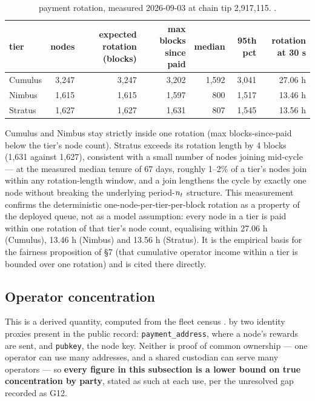 \begin{table}[H]
\centering
\small
\begin{tabular}{lrrrrrr}
\toprule
tier & nodes & expected rotation (blocks) & max blocks since paid & median & 95th pct & rotation at 30 s \\
\midrule
Cumulus & 3,247 & 3,247 & 3,202 & 1,592 & 3,041 & 27.06 h \\
Nimbus & 1,615 & 1,615 & 1,597 & 800 & 1,517 & 13.46 h \\
Stratus & 1,627 & 1,627 & 1,631 & 807 & 1,545 & 13.56 h \\
\bottomrule
\end{tabular}
\caption{\PoN payment rotation, measured 2026-09-03 at chain tip 2,917,115.
.}
\label{tab:eval-rotation}
\end{table}

Cumulus and Nimbus stay strictly inside one rotation (max blocks-since-paid below the tier's node
count). Stratus exceeds its rotation length by 4 blocks (1,631 against 1,627), consistent with a
small number of nodes joining mid-cycle — at the measured median tenure of 67 days, roughly 1--2\%
of a tier's nodes join within any rotation-length window, and a join lengthens the cycle by exactly
one node without breaking the underlying period-$n_{t}$ structure. This measurement confirms
the deterministic one-node-per-tier-per-block rotation as a property of the deployed queue, not as
a model assumption: every node in a tier is paid within one rotation of that tier's node count,
equalising within 27.06 h (Cumulus), 13.46 h (Nimbus) and 13.56 h (Stratus). It is the empirical
basis for the fairness proposition of \S7 (that cumulative operator income within a tier is bounded
over one rotation) and is cited there directly.

\subsection{Operator concentration}
\label{sec:eval-concentration}

This is a derived quantity, computed from the fleet census
\shipped {}.  by two identity proxies present in the public
record: \texttt{payment\_address}, where a node's rewards are sent, and \texttt{pubkey}, the node
key. Neither is proof of common ownership — one operator can use many addresses, and a shared
custodian can serve many operators — so \textbf{every figure in this subsection is a lower bound on
true concentration by party}, stated as such at each use, per the unresolved gap recorded as G12.

